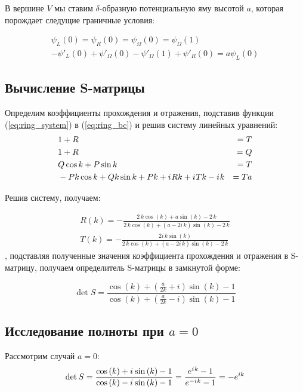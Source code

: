 В вершине $V$ мы ставим $\delta$-образную потенциальную яму высотой $a$, которая порождает следущие граничные условия:

\begin{equation}\label{eq:ring_bc}
\begin{aligned}
\psi_L(0) = \psi_R(0) = \psi_\Omega(0) = \psi_\Omega(1) \\ 
-\psi'_L(0) + \psi'_\Omega(0) - \psi'_\Omega(1) + \psi'_R(0) = a \psi_L(0)
\end{aligned}
\end{equation}


\subsection{Вычисление S-матрицы}
Определим коэффициенты прохождения и отражения, подставив функции (\ref{eq:ring_system}) в (\ref{eq:ring_bc}) и решив систему линейных уравнений:
\begin{align*}
& 1 + R &= T \\
& 1 + R &= Q \\
& Q \cos k + P \sin k &= T \\
& -P k \cos k + Q k \sin k + P k + {i\mkern1mu} R k + {i\mkern1mu} T k - {i\mkern1mu} k &= T a
\end{align*}

Решив систему, получаем:

\begin{align*}
R(k) = -\frac{2 \, k \cos\left(k\right) + a \sin\left(k\right) - 2 \, k}{2 \, k \cos\left(k\right) + {\left(a - 2 i \, k\right)} \sin\left(k\right) - 2 \, k} \\
T(k) = -\frac{2 i \, k \sin\left(k\right)}{2 \, k \cos\left(k\right) + {\left(a - 2 i \, k\right)} \sin\left(k\right) - 2 \, k}
\end{align*}
, подставляя полученные значения коэффициента прохождения и отражения в S-матрицу, получаем определитель S-матрицы в замкнутой форме:

\begin{equation}\label{eq:ring_detS}
\det S = 
\frac
{\cos\left(k\right) + {\left(\frac{a}{2 k} + i\right)} \sin\left(k\right) - 1}
{\cos\left(k\right) + {\left(\frac{a}{2 k} - i\right)} \sin\left(k\right) - 1}
\end{equation}


\subsection{Исследование полноты при $a=0$}
Рассмотрим случай $a=0$:
\[
\det S
= \frac
{\cos\left(k\right) + {i\mkern1mu} \sin\left(k\right) - 1}
{\cos\left(k\right) - {i\mkern1mu} \sin\left(k\right) - 1}
= \frac{e^{{i\mkern1mu} k} - 1}{e^{-{i\mkern1mu} k} - 1}
= -e^{i k}
\]

